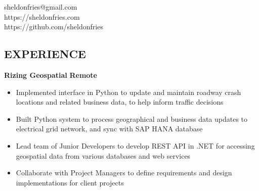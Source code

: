 \documentclass[margin,line]{resume}
\begin{document}
{
    \hfill sheldonfries@gmail.com       \vspace{0mm}\\\vspace{0mm}%
    \hfill https://sheldonfries.com           \vspace{0mm}\\\vspace{0mm}%
    \hfill https://github.com/sheldonfries \vspace{0mm}\\\vspace{-9mm}%
}

\begin{resume}

    \vspace{-1mm}

    \section{\mysidestyle \textbf{\large{E}\small{XPERIENCE}}}

    \textbf{\listing Rizing Geospatial} \hfill \textbf{Remote}\vspace{2mm}\\\vspace{1mm}%
    \begin{itemize}[noitemsep,topsep=3pt,before=\textsl{Senior Developer} \hfill \textsl{April 2023 -- Present}
    \\\textsl{GIS Developer} \hfill \textsl{December 2021 -- March 2023},after=\vspace{\medskipamount}]
    \item Implemented interface in Python to update and maintain roadway crash locations and related business data, to help inform traffic decisions
    \item Built Python system to process geographical and business data updates to electrical grid network, and sync with SAP HANA database
    \item Lead team of Junior Developers to develop REST API in .NET for accessing geospatial data from various databases and web services
    \item Collaborate with Project Managers to define requirements and design implementations for client projects 
    \end{itemize}
    

\end{resume}
\end{document}

